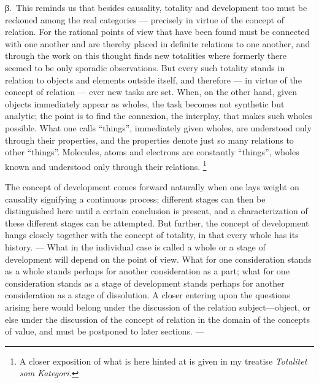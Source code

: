 \documentclass[12pt]{article}
\newcommand{\opage}[1]{\marginnote{\footnotesize\textit{[#1]}}}
\begin{document}
%
\label{sec:3c-beta}%
β.~This reminds us that besides causality, totality and development too must
be reckoned among the real categories --- precisely in virtue of the concept
of relation. For the rational points of view that have been found must be
connected with one another and are thereby placed in definite relations to
one another, and through the work on this thought finds new totalities where
formerly there seemed to be only sporadic observations. But every \opage{56}such
totality stands in relation to objects and elements outside itself, and
therefore --- in virtue of the concept of relation --- ever new tasks are
set. When, on the other hand, given objects immediately appear as wholes,
the task becomes not synthetic but analytic; the point is to find the
connexion, the interplay, that makes such wholes possible. What one calls
``things'', immediately given wholes, are understood only through their
properties, and the properties denote just so many relations to other
``things''. Molecules, atoms and electrons are constantly ``things'', wholes
known and understood only through their relations.%
\footnote{A closer exposition of what is here hinted at is given in my
treatise \textit{Totalitet som Kategori.}}

The concept of development comes forward naturally when one lays weight on
causality signifying a continuous process; different stages can then be
distinguished here until a certain conclusion is present, and a
characterization of these different stages can be attempted. But further,
the concept of development hangs closely together with the concept of
totality, in that every whole has its history. --- What in the individual
case is called a whole or a stage of development will depend on the point of
view. What for one consideration stands as a whole stands perhaps for
another consideration as a part; what for one consideration stands as a
stage of development stands perhaps for another consideration as a stage of
dissolution. A closer entering upon the questions arising here would belong
under the discussion of the relation subject---object, or else under the
discussion of the concept of relation in the domain of the concepts of
value, and must be postponed to later sections. ---
\end{document}
